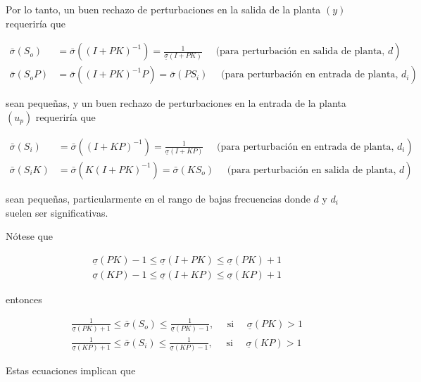 Por lo tanto, un buen rechazo de perturbaciones en la salida de la planta $(y)$ requeriría que

$$
\begin{aligned}
\bar{\sigma}\left(S_{o}\right) & \left.=\bar{\sigma}\left((I+P K)^{-1}\right)=\frac{1}{\underline{\sigma}(I+P K)} \quad \text { (para perturbación en salida de planta, } d\right) \\
\bar{\sigma}\left(S_{o} P\right) & \left.=\bar{\sigma}\left((I+P K)^{-1} P\right)=\bar{\sigma}\left(P S_{i}\right) \quad \text { (para perturbación en entrada de planta, } d_{i}\right)
\end{aligned}
$$

sean pequeñas, y un buen rechazo de perturbaciones en la entrada de la planta $\left(u_{p}\right)$ requeriría que

$$
\begin{aligned}
\bar{\sigma}\left(S_{i}\right) & \left.=\bar{\sigma}\left((I+K P)^{-1}\right)=\frac{1}{\underline{\sigma}(I+K P)} \quad \text { (para perturbación en entrada de planta, } d_{i}\right) \\
\bar{\sigma}\left(S_{i} K\right) & \left.=\bar{\sigma}\left(K(I+P K)^{-1}\right)=\bar{\sigma}\left(K S_{o}\right) \quad \text { (para perturbación en salida de planta, } d\right)
\end{aligned}
$$

sean pequeñas, particularmente en el rango de bajas frecuencias donde $d$ y $d_{i}$ suelen ser significativas.

Nótese que

$$
\begin{aligned}
& \underline{\sigma}(P K)-1 \leq \underline{\sigma}(I+P K) \leq \underline{\sigma}(P K)+1 \\
& \underline{\sigma}(K P)-1 \leq \underline{\sigma}(I+K P) \leq \underline{\sigma}(K P)+1
\end{aligned}
$$

entonces

$$
\begin{aligned}
& \frac{1}{\underline{\sigma}(P K)+1} \leq \bar{\sigma}\left(S_{o}\right) \leq \frac{1}{\underline{\sigma}(P K)-1}, \quad \text { si } \quad \underline{\sigma}(P K)>1 \\
& \frac{1}{\underline{\sigma}(K P)+1} \leq \bar{\sigma}\left(S_{i}\right) \leq \frac{1}{\underline{\sigma}(K P)-1}, \quad \text { si } \quad \underline{\sigma}(K P)>1
\end{aligned}
$$

Estas ecuaciones implican que

